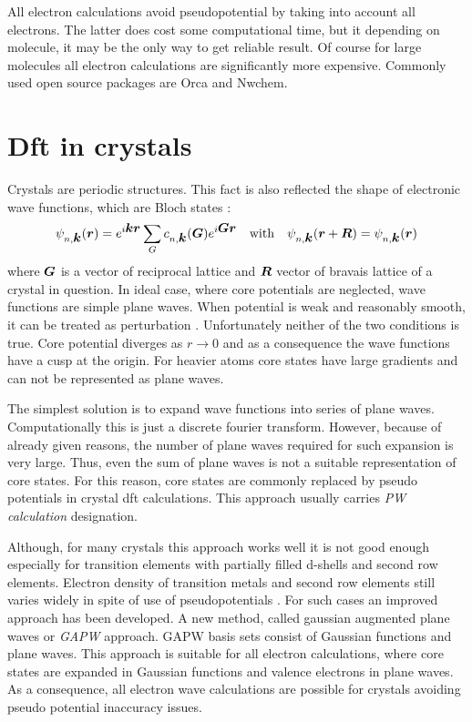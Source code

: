\documentclass[openany, longbibliography,slovene,a4paper,12pt]{article}
\def\vec#1{\mbox{\boldmath$#1$}}
\begin{document}
All electron calculations avoid pseudopotential by taking into account all
electrons. The latter does cost some computational time, but it depending on
molecule, it may be the only way to get reliable result. Of course for large
molecules all electron calculations are significantly more expensive.
Commonly used open source packages are Orca and Nwchem.


\section{Dft in crystals}
Crystals are periodic structures. This fact is also reflected the shape of electronic  wave functions, which are Bloch states \cite{solid_state_physics}:
\begin{equation}
  \psi_{n,\vec k}(\vec r) =e^{i\vec k\vec r}\sum_G c_{n,\vec k}(\vec G)e^{i\vec G \vec r} \quad \mathrm{with} \quad \psi_{n,\vec k}(\vec r+\vec R)= \psi_{n,\vec k}(\vec r)
\end{equation}
where $\vec G$ is a vector of reciprocal lattice and $\vec R$ vector of bravais lattice of a crystal in question.
In ideal case, where core potentials are neglected, wave functions are simple plane waves. When potential is weak and reasonably smooth, it can be treated as perturbation \cite{solid_state_physics}.
Unfortunately neither of the two conditions is true. Core potential diverges as $r \rightarrow 0$
and as a consequence the wave functions have a cusp at the origin. For heavier
atoms core states have large gradients and can not be represented as plane waves.

The simplest solution is to expand wave functions into series of plane waves.
Computationally this is just a discrete fourier transform.
However, because of already given reasons, the number of plane waves required
for such expansion is very large. Thus, even the sum of plane waves is not a
suitable representation of core states. For this reason, core states are
commonly replaced by pseudo potentials in crystal dft calculations. This
approach usually carries \emph{PW calculation} designation.

Although, for many crystals this approach works well it is not good enough
especially for transition elements with partially filled d-shells and second row
elements. Electron density of transition metals and second row elements still
varies widely in spite of use of pseudopotentials \cite{large_scale_quant_mechan_enzym}. For such cases an improved
approach has been developed. A new method, called gaussian augmented plane waves
or \emph{GAPW} approach. GAPW basis sets consist of Gaussian functions and plane
waves. This approach is suitable for all electron calculations, where core
states are expanded in Gaussian functions and valence electrons in plane waves. As a consequence, all electron wave calculations are possible for crystals avoiding pseudo potential inaccuracy issues.
\end{document}
